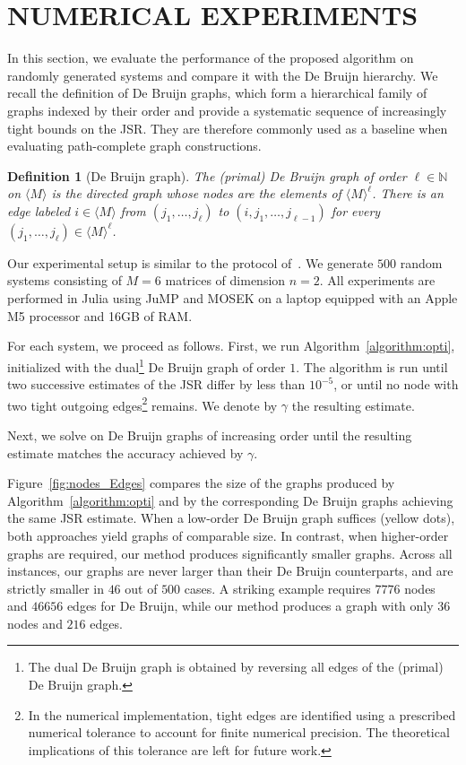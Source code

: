 \documentclass[letterpaper, 10 pt, conference]{ieeeconf}  %
\newcommand{\Mset}{\langle M\rangle}
\newcommand{\Ne}{\mathbb{N}}
\newtheorem{definition}{Definition}
\begin{document}
\section{NUMERICAL EXPERIMENTS}\label{sec:experiments}
In this section, we evaluate the performance of the proposed algorithm
on randomly generated systems and compare it with the De Bruijn
hierarchy. We recall the
definition of De Bruijn graphs, which form a hierarchical family of graphs indexed
by their order and provide a systematic sequence of increasingly tight
bounds on the JSR. They are therefore commonly used as a baseline when
evaluating path-complete graph constructions.

\begin{definition}[De Bruijn graph]
The \emph{(primal) De Bruijn graph} of order $\ell \in\Ne$ on $\Mset$ is the
directed graph whose nodes are the elements of $\Mset^\ell$.
There is an edge labeled $i\in\Mset$ from $(j_1,\ldots,j_\ell)$ to
$(i,j_1,\ldots,j_{\ell-1})$ for every $(j_1,\ldots,j_\ell)\in\Mset^\ell$.
\end{definition}

Our experimental setup is similar to the protocol of~\cite[Example~4.3]{debauche2026}. We generate $500$ random systems consisting of $M=6$ matrices of
dimension $n=2$. All experiments are performed in Julia using JuMP and
MOSEK on a laptop equipped with an Apple M5 processor and 16GB of RAM.

For each system, we proceed as follows. First, we run
Algorithm~\ref{algorithm:opti}, initialized with the dual\footnote{The dual
De Bruijn graph is obtained by reversing all edges of the (primal)
De Bruijn graph.} De Bruijn graph of order $1$. The algorithm is run
until two successive estimates of the JSR differ by less than $10^{-5}$,
or until no node with two tight outgoing edges\footnote{In the numerical
implementation, tight edges are identified using a prescribed numerical
tolerance to account for finite numerical precision. The theoretical
implications of this tolerance are left for future work.} remains. We denote by
$\gamma$ the resulting estimate.

Next, we solve  on De Bruijn graphs of increasing order until the resulting estimate matches the accuracy achieved by $\gamma$.

Figure~\ref{fig:nodes_Edges} compares the size of the graphs produced by Algorithm~\ref{algorithm:opti} and by the corresponding De Bruijn graphs achieving the same JSR estimate. When a low-order De Bruijn graph suffices (yellow dots), both approaches yield graphs of comparable size. In contrast, when higher-order graphs are required, our method produces significantly smaller graphs. Across all instances, our graphs are never larger than their De Bruijn counterparts, and are strictly smaller in $46$ out of $500$ cases. A striking example requires $7776$ nodes and $46656$ edges for De Bruijn, while our method produces a graph with only $36$ nodes and $216$ edges.
\end{document}
